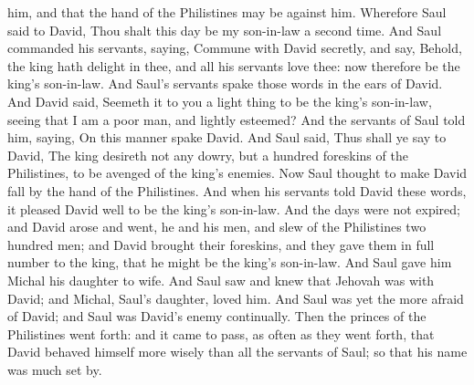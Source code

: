 him, and that the hand of the Philistines may be against him. Wherefore Saul said to David, Thou shalt this day be my son-in-law a second time.  And Saul commanded his servants, saying, Commune with David secretly, and say, Behold, the king hath delight in thee, and all his servants love thee: now therefore be the king’s son-in-law. And Saul’s servants spake those words in the ears of David. And David said, Seemeth it to you a light thing to be the king’s son-in-law, seeing that I am a poor man, and lightly esteemed? And the servants of Saul told him, saying, On this manner spake David. And Saul said, Thus shall ye say to David, The king desireth not any dowry, but a hundred foreskins of the Philistines, to be avenged of the king’s enemies. Now Saul thought to make David fall by the hand of the Philistines. And when his servants told David these words, it pleased David well to be the king’s son-in-law. And the days were not expired; and David arose and went, he and his men, and slew of the Philistines two hundred men; and David brought their foreskins, and they gave them in full number to the king, that he might be the king’s son-in-law. And Saul gave him Michal his daughter to wife. And Saul saw and knew that Jehovah was with David; and Michal, Saul’s daughter, loved him. And Saul was yet the more afraid of David; and Saul was David’s enemy continually.  Then the princes of the Philistines went forth: and it came to pass, as often as they went forth, that David behaved himself more wisely than all the servants of Saul; so that his name was much set by. 

